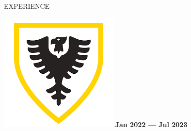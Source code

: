\documentclass{resume} %
\begin{document}
\begin{rSection}{EXPERIENCE}


\includegraphics[height=3\fontcharht\font`\B]{dal_logo.png}%
 \hfill \textbf{Jan 2022 --- Jul 2023}\vspace{-0.2cm}



\end{rSection}
\end{document}

